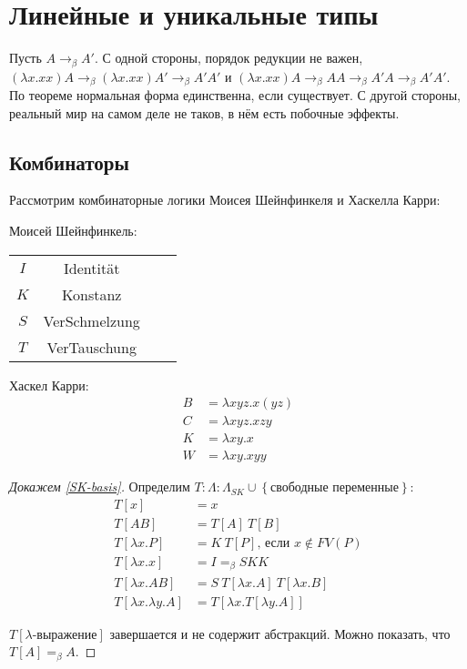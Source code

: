 \section{\texorpdfstring{Линейные и уникальные типы}{Linear and unique types}}

Пусть $A \rightarrow_\beta A'$.
С одной стороны, порядок редукции не важен, %
$(\lambda x . x x) A \rightarrow_\beta (\lambda x . x x) A' \rightarrow_\beta A' A'$
и $(\lambda x . x x) A \rightarrow_\beta A A \rightarrow_\beta A' A \rightarrow_\beta A' A'$.
По теореме  нормальная форма единственна, если существует.
С другой стороны, реальный мир на самом деле не таков, в нём есть побочные эффекты.

\subsection{\texorpdfstring{Комбинаторы}{Combinators}}

Рассмотрим комбинаторные логики Моисея Шейнфинкеля и Хаскелла Карри:

Моисей Шейнфинкель:
\begin{center}
\begin{tabular}{Sc Sl}
    $I$ & Identität \\
    $K$ & Konstanz \\
    $S$ & VerSchmelzung \\
    $T$ & VerTauschung
\end{tabular}
\end{center}

Хаскел Карри:
\begin{align*}
    B &= \lambda x y z . x (y z) \\
    C &= \lambda x y z . x z y \\
    K &= \lambda x y . x \\
    W &= \lambda x y . x y y
\end{align*}


\begin{proof}[Докажем \ref{SK-basis}]
    Определим $T : \Lambda : \Lambda_{SK} \cup \left\{ \text{свободные переменные} \right\}$:
    \begin{align*}
        T[x] &= x \\
        T[A B] &= T[A]\ T[B]  \\
        T[\lambda x . P] &= K\ T[P] \text{, если $x \notin FV(P)$} \\
        T[\lambda x . x] &= I =_\beta SKK \\
        T[\lambda x . A B] &= S\ T[\lambda x . A]\ T[\lambda x . B] \\
        T[\lambda x . \lambda y . A] &= T[\lambda x . T[\lambda y . A]]
    \end{align*}

    $T[\lambda\text{-выражение}]$ завершается и не содержит абстракций.
    Можно показать, что $T[A] =_\beta A$.
\end{proof}

